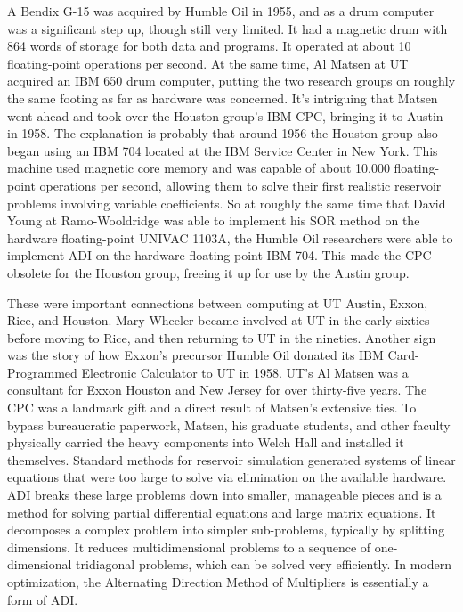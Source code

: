 A Bendix G-15 was acquired by Humble Oil in 1955, and as a drum computer was a significant step up, though still very limited. It had a magnetic drum with 864 words of storage for both data and programs. It operated at about 10 floating-point operations per second. At the same time, Al Matsen at UT acquired an IBM 650 drum computer, putting the two research groups on roughly the same footing as far as hardware was concerned. It’s intriguing that Matsen went ahead and took over the Houston group’s IBM CPC, bringing it to Austin in 1958. The explanation is probably that around 1956 the Houston group also began using an IBM 704 located at the IBM Service Center in New York. This machine used magnetic core memory and was capable of about 10,000 floating-point operations per second, allowing them to solve their first realistic reservoir problems involving variable coefficients. So at roughly the same time that David Young at Ramo-Wooldridge was able to implement his SOR method on the hardware floating-point UNIVAC 1103A, the Humble Oil researchers were able to implement ADI on the hardware floating-point IBM 704. This made the CPC obsolete for the Houston group, freeing it up for use by the Austin group. \cite{peacemanPersonalRetrospectionReservoir1990}

These were important connections between computing at UT Austin, Exxon, Rice, and Houston. Mary Wheeler became involved at UT in the early sixties before moving to Rice, and then returning to UT in the nineties. Another sign was the story of how Exxon’s precursor Humble Oil donated its IBM Card-Programmed Electronic Calculator to UT in 1958. UT’s Al Matsen was a consultant for Exxon Houston and New Jersey for over thirty-five years. The CPC was a landmark gift and a direct result of Matsen’s extensive ties. To bypass bureaucratic paperwork, Matsen, his graduate students, and other faculty physically carried the heavy components into Welch Hall and installed it themselves. Standard methods for reservoir simulation generated systems of linear equations that were too large to solve via elimination on the available hardware. ADI breaks these large problems down into smaller, manageable pieces and is a method for solving partial differential equations and large matrix equations. It decomposes a complex problem into simpler sub-problems, typically by splitting dimensions. It reduces multidimensional problems to a sequence of one-dimensional tridiagonal problems, which can be solved very efficiently. In modern optimization, the Alternating Direction Method of Multipliers is essentially a form of ADI. \cite{oakesFrederickAlbertMatsen2026}

